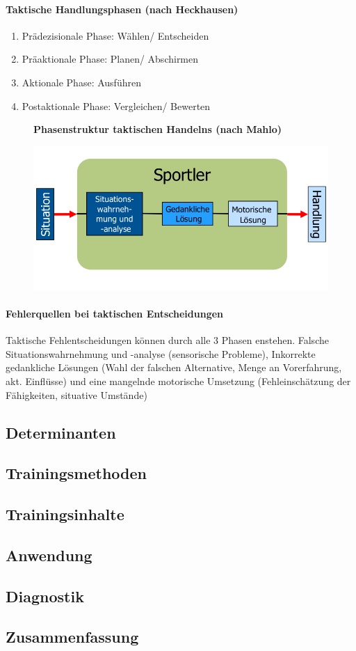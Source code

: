 \paragraph{Taktische Handlungsphasen (nach Heckhausen)}
\begin{enumerate}
  \item Prädezisionale Phase: Wählen/ Entscheiden
  \item Präaktionale Phase: Planen/ Abschirmen
  \item Aktionale Phase: Ausführen
  \item Postaktionale Phase: Vergleichen/ Bewerten
\end{enumerate}
\begin{figure}[H]
  \begin{flushleft}
    \textbf{Phasenstruktur taktischen Handelns (nach Mahlo)}
  \end{flushleft}
  \centering
  \includegraphics[width=.7\textwidth]{pictures/taktik_phasenstruktur_des_handelns.png}
\end{figure}
\paragraph{Fehlerquellen bei taktischen Entscheidungen} Taktische Fehlentscheidungen können durch alle 3 Phasen enstehen. Falsche Situationswahrnehmung und -analyse (sensorische Probleme), Inkorrekte gedankliche Lösungen (Wahl der falschen Alternative, Menge an Vorerfahrung, akt. Einflüsse) und eine mangelnde motorische Umsetzung (Fehleinschätzung der Fähigkeiten, situative Umstände)


\subsection{Determinanten}

\subsection{Trainingsmethoden}

\subsection{Trainingsinhalte}

\subsection{Anwendung}

\subsection{Diagnostik}

\subsection{Zusammenfassung}
